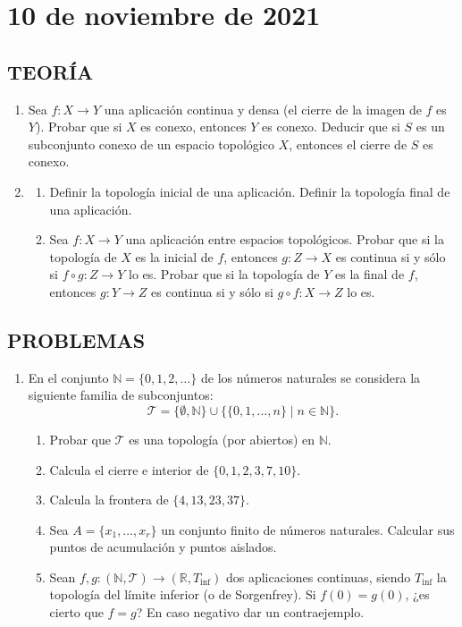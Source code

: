 \newpage

\section{10 de noviembre de 2021}

\subsection*{TEORÍA}
\begin{enumerate}
    \item Sea $f: X \to Y$ una aplicación continua y densa (el cierre de la imagen de $f$ es $Y$). Probar que si $X$ es conexo, entonces $Y$ es conexo. Deducir que si $S$ es un subconjunto conexo de un espacio topológico $X$, entonces el cierre de $S$ es conexo.
    \item 
    \begin{enumerate}[label=(\alph*)]
        \item Definir la topología inicial de una aplicación. Definir la topología final de una aplicación.
        \item Sea $f: X \to Y$ una aplicación entre espacios topológicos. Probar que si la topología de $X$ es la inicial de $f$, entonces $g: Z \to X$ es continua si y sólo si $f \circ g: Z \to Y$ lo es. Probar que si la topología de $Y$ es la final de $f$, entonces $g: Y \to Z$ es continua si y sólo si $g \circ f: X \to Z$ lo es.
    \end{enumerate}
\end{enumerate}

\subsection*{PROBLEMAS}
\begin{enumerate} %
    \item En el conjunto $\mathbb{N} = \{0, 1, 2, \dots\}$ de los números naturales se considera la siguiente familia de subconjuntos:
    \[
    \mathcal{T} = \{\emptyset, \mathbb{N}\} \cup \{\{0, 1, \dots, n\} \mid n \in \mathbb{N}\}.
    \]
    \begin{enumerate}[label=(\alph*)]
        \item Probar que $\mathcal{T}$ es una topología (por abiertos) en $\mathbb{N}$.
        \item Calcula el cierre e interior de $\{0, 1, 2, 3, 7, 10\}$.
        \item Calcula la frontera de $\{4, 13, 23, 37\}$.
        \item Sea $A = \{x_1, \dots, x_r\}$ un conjunto finito de números naturales. Calcular sus puntos de acumulación y puntos aislados.
        \item Sean $f, g: (\mathbb{N}, \mathcal{T}) \to (\mathbb{R}, T_{\inf})$ dos aplicaciones continuas, siendo $T_{\inf}$ la topología del límite inferior (o de Sorgenfrey). Si $f(0) = g(0)$, ¿es cierto que $f = g$? En caso negativo dar un contraejemplo.
    \end{enumerate}
\end{enumerate}